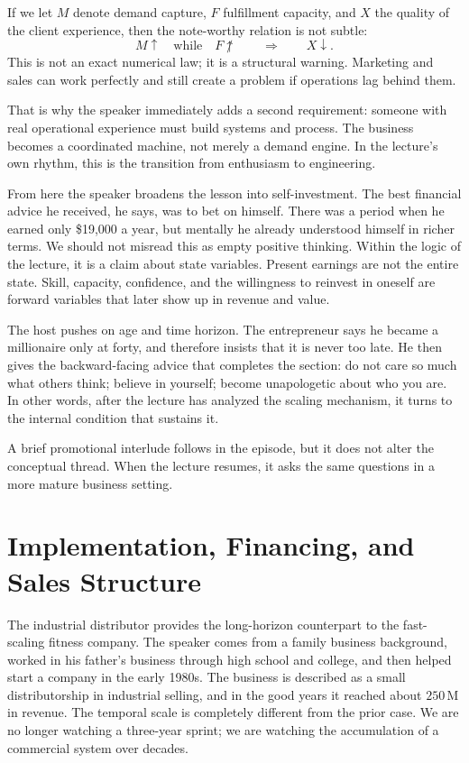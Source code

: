 If we let $M$ denote demand capture, $F$ fulfillment capacity, and $X$ the quality of the client experience, then the note-worthy relation is not subtle:
\begin{equation}
M \uparrow \quad \text{while} \quad F \not\uparrow
\qquad \Longrightarrow \qquad
X \downarrow.
\end{equation}
This is not an exact numerical law; it is a structural warning. Marketing and sales can work perfectly and still create a problem if operations lag behind them.

That is why the speaker immediately adds a second requirement: someone with real operational experience must build systems and process. The business becomes a coordinated machine, not merely a demand engine. In the lecture's own rhythm, this is the transition from enthusiasm to engineering.

From here the speaker broadens the lesson into self-investment. The best financial advice he received, he says, was to bet on himself. There was a period when he earned only \$19,000 a year, but mentally he already understood himself in richer terms. We should not misread this as empty positive thinking. Within the logic of the lecture, it is a claim about state variables. Present earnings are not the entire state. Skill, capacity, confidence, and the willingness to reinvest in oneself are forward variables that later show up in revenue and value.

The host pushes on age and time horizon. The entrepreneur says he became a millionaire only at forty, and therefore insists that it is never too late. He then gives the backward-facing advice that completes the section: do not care so much what others think; believe in yourself; become unapologetic about who you are. In other words, after the lecture has analyzed the scaling mechanism, it turns to the internal condition that sustains it.

A brief promotional interlude follows in the episode, but it does not alter the conceptual thread. When the lecture resumes, it asks the same questions in a more mature business setting.

\section{Implementation, Financing, and Sales Structure}

The industrial distributor provides the long-horizon counterpart to the fast-scaling fitness company. The speaker comes from a family business background, worked in his father's business through high school and college, and then helped start a company in the early 1980s. The business is described as a small distributorship in industrial selling, and in the good years it reached about $250\,\mathrm{M}$ in revenue. The temporal scale is completely different from the prior case. We are no longer watching a three-year sprint; we are watching the accumulation of a commercial system over decades.

